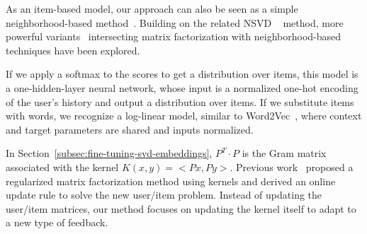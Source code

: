 \documentclass[sigconf]{acmart}
\begin{document}
As an item-based model, our approach can also be seen as a simple neighborhood-based method~\cite{neighbors}. Building on the related NSVD ~\cite{paterek} method, more powerful variants~\cite{koren} intersecting matrix factorization with neighborhood-based techniques have been explored.

If we apply a softmax to the scores to get a distribution over items, this model is a one-hidden-layer neural network, whose input is a normalized one-hot encoding of the user's history and output a distribution over items. If we substitute items with words, we recognize a log-linear model, similar to Word2Vec~\cite{NIPS2013_5021}, where context and target parameters are shared and inputs normalized.

In Section~\ref{subsec:fine-tuning-svd-embeddings}, $ P^T \cdot P $ is the Gram matrix associated with the kernel $ K(x, y) = <Px, Py> $. Previous work~\cite{kernel-mf} proposed a regularized matrix factorization method using kernels and derived an online update rule to solve the new user/item problem. Instead of updating the user/item matrices, our method focuses on updating the kernel itself to adapt to a new type of feedback.
\end{document}
